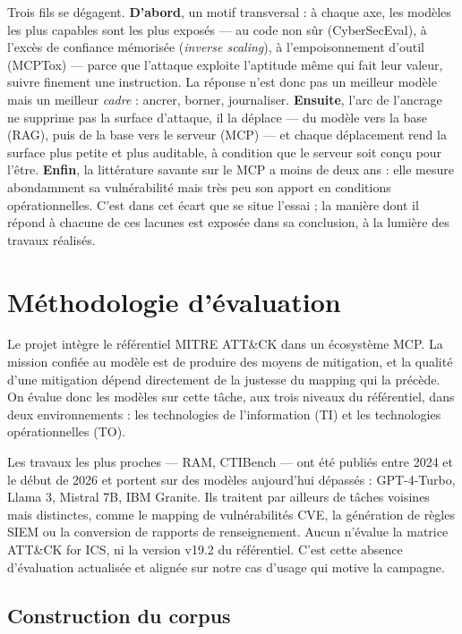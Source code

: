 Trois fils se dégagent. \textbf{D'abord}, un motif transversal : à chaque axe, les modèles les plus capables sont les plus exposés --- au code non sûr (CyberSecEval), à l'excès de confiance mémorisée (\emph{inverse scaling}), à l'empoisonnement d'outil (MCPTox) --- parce que l'attaque exploite l'aptitude même qui fait leur valeur, suivre finement une instruction. La réponse n'est donc pas un meilleur modèle mais un meilleur \emph{cadre} : ancrer, borner, journaliser. \textbf{Ensuite}, l'arc de l'ancrage ne supprime pas la surface d'attaque, il la déplace --- du modèle vers la base (RAG), puis de la base vers le serveur (MCP) --- et chaque déplacement rend la surface plus petite et plus auditable, à condition que le serveur soit conçu pour l'être. \textbf{Enfin}, la littérature savante sur le MCP a moins de deux ans : elle mesure abondamment sa vulnérabilité mais très peu son apport en conditions opérationnelles. C'est dans cet écart que se situe l'essai ; la manière dont il répond à chacune de ces lacunes est exposée dans sa conclusion, à la lumière des travaux réalisés.

\section{Méthodologie d'évaluation}\label{sec:methodo}
Le projet intègre le référentiel MITRE ATT\&CK dans un écosystème MCP. La mission confiée au modèle est de produire des moyens de mitigation, et la qualité d'une mitigation dépend directement de la justesse du mapping qui la précède. On évalue donc les modèles sur cette tâche, aux trois niveaux du référentiel, dans deux environnements : les technologies de l'information (TI) et les technologies opérationnelles (TO).

Les travaux les plus proches --- RAM, CTIBench --- ont été publiés entre 2024 et le début de 2026 et portent sur des modèles aujourd'hui dépassés : GPT-4-Turbo, Llama 3, Mistral 7B, IBM Granite. Ils traitent par ailleurs de tâches voisines mais distinctes, comme le mapping de vulnérabilités CVE, la génération de règles SIEM ou la conversion de rapports de renseignement. Aucun n'évalue la matrice ATT\&CK for ICS, ni la version v19.2 du référentiel. C'est cette absence d'évaluation actualisée et alignée sur notre cas d'usage qui motive la campagne.

\FloatBarrier
\subsection{Construction du corpus}\label{sec:meth-corpus}


